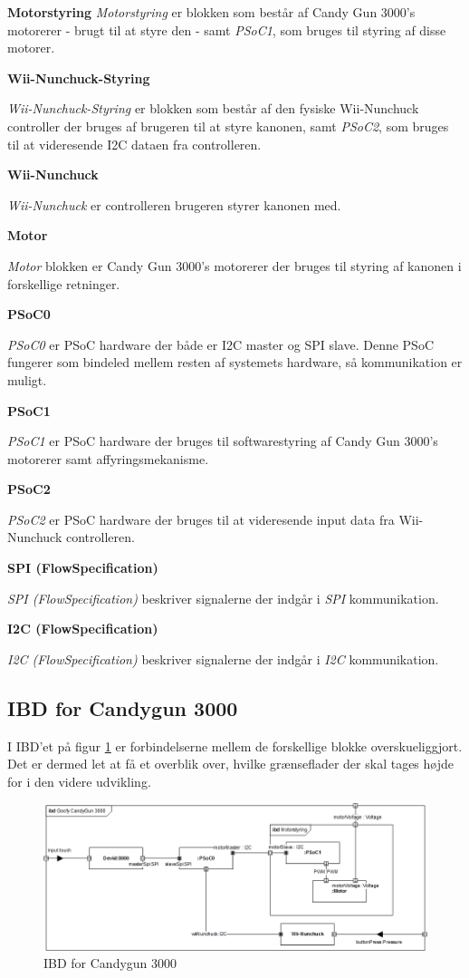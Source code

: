 \textbf{Motorstyring}
\newline
\textit{Motorstyring} er blokken som består af Candy Gun 3000's motorerer - brugt til at styre den - samt \textit{PSoC1}, som bruges til styring af disse motorer.

\textbf{Wii-Nunchuck-Styring}

\textit{Wii-Nunchuck-Styring} er blokken som består af den fysiske Wii-Nunchuck controller der bruges af brugeren til at styre kanonen, samt \textit{PSoC2}, som bruges til at videresende I2C dataen fra controlleren.

\textbf{Wii-Nunchuck}

\textit{Wii-Nunchuck} er controlleren brugeren styrer kanonen med.

\textbf{Motor}

\textit{Motor} blokken er Candy Gun 3000's motorerer der bruges til styring af kanonen i forskellige retninger.

\textbf{PSoC0}

\textit{PSoC0} er PSoC hardware der både er I2C master og SPI slave. Denne PSoC fungerer som bindeled mellem resten af systemets hardware, så kommunikation er muligt.

\textbf{PSoC1}

\textit{PSoC1} er PSoC hardware der bruges til softwarestyring af Candy Gun 3000's motorerer samt affyringsmekanisme.

\textbf{PSoC2}

\textit{PSoC2} er PSoC hardware der bruges til at videresende input data fra Wii-Nunchuck controlleren.	

\textbf{SPI (FlowSpecification)}

\textit{SPI (FlowSpecification)} beskriver signalerne der indgår i \textit{SPI} kommunikation.

\textbf{I2C (FlowSpecification)}

\textit{I2C (FlowSpecification)} beskriver signalerne der indgår i \textit{I2C} kommunikation.
\subsection{IBD for Candygun 3000}
I IBD'et på figur \ref{fig:IBD} er forbindelserne mellem de forskellige blokke overskueliggjort. Det er dermed let at få et overblik over, hvilke grænseflader der skal tages højde for i den videre udvikling. 

\begin{figure}[H]
	\centering
	\includegraphics[width=\textwidth]{Systemarkitektur/images/GoofyCandyIBDImageRev2.png}
	\caption{IBD for Candygun 3000}
	\label{fig:IBD}
\end{figure}

